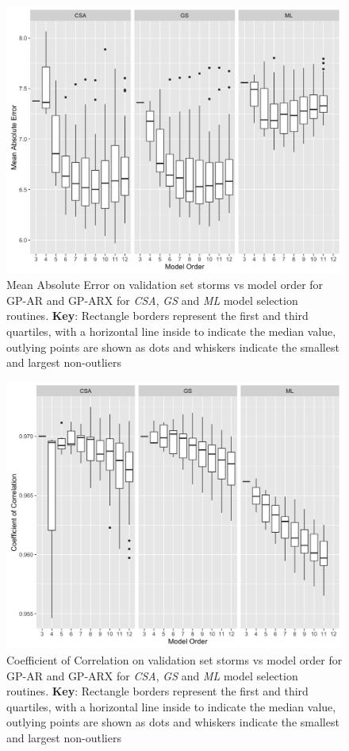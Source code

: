 \documentclass{article}
\begin{document}
\begin{figure}[h]
  \includegraphics[width=\textwidth]{Compare-mae-arx.png}
  \caption{Mean Absolute Error on validation set storms vs model order for GP-AR and GP-ARX for \emph{CSA}, \emph{GS} and \emph{ML} model selection routines. \textbf{Key}: Rectangle borders represent the first and third quartiles, with a horizontal line inside to indicate the median value, outlying points are shown as dots and whiskers indicate the smallest and largest non-outliers}
  \label{fig:CompareMaeARX}
\end{figure}

\begin{figure}[h]
  \includegraphics[width=\textwidth]{Compare-cc-arx.png}
  \caption{Coefficient of Correlation on validation set storms vs model order for GP-AR and GP-ARX for \emph{CSA}, \emph{GS} and \emph{ML} model selection routines. \textbf{Key}: Rectangle borders represent the first and third quartiles, with a horizontal line inside to indicate the median value, outlying points are shown as dots and whiskers indicate the smallest and largest non-outliers}
  \label{fig:CompareCCARX}
\end{figure}
\end{document}
